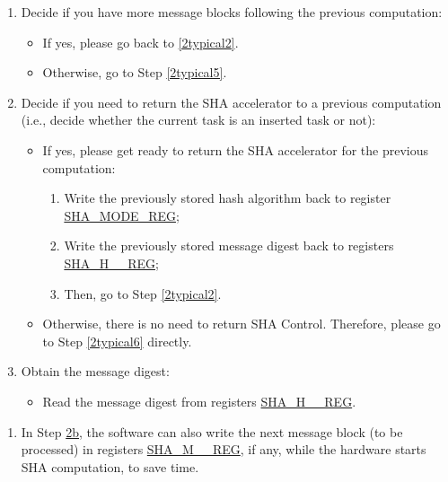\documentclass[main\_\_EN.tex]{subfiles}
\begin{document}
\begin{enumerate}
    \item \label{2typical4}
    Decide if you have more message blocks following the previous computation:
        \begin{itemize}
            \item If yes, please go back to \ref{2typical2}.
            \item Otherwise, go to Step \ref{2typical5}.
            \end{itemize}

    \item \label{2typical5} Decide if you need to return the SHA accelerator to a previous computation (i.e., decide whether the current task is an inserted task or not):
        \begin{itemize}
            \item If yes, please get ready to return the SHA accelerator for the previous computation:
            \begin{enumerate}
                \item Write the previously stored hash algorithm back to register \hyperref[regdesc:SHAMODEREG]{SHA\_MODE\_REG};
                \item Write the previously stored message digest back to registers \hyperref[regdesc:SHAHNREG]{SHA\_H\_\_REG};
                \item Then, go to Step \ref{2typical2}.
            \end{enumerate}
            \item Otherwise, there is no need to return SHA Control. Therefore, please go to Step \ref{2typical6} directly.
        \end{itemize}

    \item \label{2typical6} Obtain the message digest:
    \begin{itemize}
        \item Read the message digest from registers \hyperref[regdesc:SHAHNREG]{SHA\_H\_\_REG}.
    \end{itemize}
\end{enumerate}

\begin{tiplisting}\label{note1}
\vspace{-2.5em}
\begin{enumerate}
\item In Step \hyperref[2b1]{2b}, the software can also write the next message block (to be processed) in registers \hyperref[regdesc:SHAMNREG]{SHA\_M\_\_REG}, if any, while the hardware starts SHA computation, to save time.
\end{enumerate}
\end{tiplisting}
\end{document}
